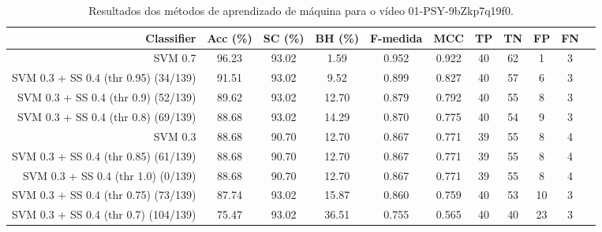 \begin{table}[!htb]
\centering
\caption{Resultados dos métodos de aprendizado de máquina para o vídeo 01-PSY-9bZkp7q19f0.}
\label{tab:01-PSY-9bZkp7q19f0}
\begin{tabular}{r|c|c|c|c|c|c|c|c|c|c}
\hline\hline
Classifier & Acc (\%) & SC (\%) & BH (\%) & F-medida & MCC & TP & TN & FP & FN \\ \hline
SVM 0.7 & 96.23 & 93.02 & 1.59 & 0.952 & 0.922 & 40 & 62 & 1 & 3 \\ 
SVM 0.3 + SS 0.4 (thr 0.95) (34/139) & 91.51 & 93.02 & 9.52 & 0.899 & 0.827 & 40 & 57 & 6 & 3 \\ 
SVM 0.3 + SS 0.4 (thr 0.9) (52/139) & 89.62 & 93.02 & 12.70 & 0.879 & 0.792 & 40 & 55 & 8 & 3 \\ 
SVM 0.3 + SS 0.4 (thr 0.8) (69/139) & 88.68 & 93.02 & 14.29 & 0.870 & 0.775 & 40 & 54 & 9 & 3 \\ 
SVM 0.3 & 88.68 & 90.70 & 12.70 & 0.867 & 0.771 & 39 & 55 & 8 & 4 \\ 
SVM 0.3 + SS 0.4 (thr 0.85) (61/139) & 88.68 & 90.70 & 12.70 & 0.867 & 0.771 & 39 & 55 & 8 & 4 \\ 
SVM 0.3 + SS 0.4 (thr 1.0) (0/139) & 88.68 & 90.70 & 12.70 & 0.867 & 0.771 & 39 & 55 & 8 & 4 \\ 
SVM 0.3 + SS 0.4 (thr 0.75) (73/139) & 87.74 & 93.02 & 15.87 & 0.860 & 0.759 & 40 & 53 & 10 & 3 \\ 
SVM 0.3 + SS 0.4 (thr 0.7) (104/139) & 75.47 & 93.02 & 36.51 & 0.755 & 0.565 & 40 & 40 & 23 & 3 \\ 
\hline\hline
\end{tabular}
\end{table}
